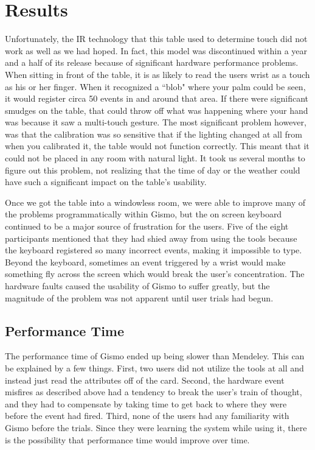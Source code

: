 \documentclass{article}
\begin{document}
\section{Results}

Unfortunately, the IR technology that this table used to determine touch did not work as well as we had hoped.  In fact, this model was discontinued within a year and a half of its release because of significant hardware performance problems.  When sitting in front of the table, it is as likely to read the users wrist as a touch as his or her finger.  When it recognized a ``blob" where your palm could be seen, it would register circa 50 events in and around that area.  If there were significant smudges on the table, that could throw off what was happening where your hand was because it saw a multi-touch gesture.  The most significant problem however, was that the calibration was so sensitive that if the lighting changed at all from when you calibrated it, the table would not function correctly.  This meant that it could not be placed in any room with natural light.  It took us several months to figure out this problem, not realizing that the time of day or the weather could have such a significant impact on the table's usability.  

Once we got the table into a windowless room, we were able to improve many of the problems programmatically within Gismo, but the on screen keyboard continued to be a major source of frustration for the users.  Five of the eight participants mentioned that they had shied away from using the tools because the keyboard registered so many incorrect events, making it impossible to type.  Beyond the keyboard, sometimes an event triggered by a wrist would make something fly across the screen which would break the user's concentration.  The hardware faults caused the usability of Gismo to suffer greatly, but the magnitude of the problem was not apparent until user trials had begun.  
      
\subsection*{Performance Time}


The performance time of Gismo ended up being slower than Mendeley.  This can be explained by a few things.  First, two users did not utilize the tools at all and instead just read the attributes off of the card.  Second, the hardware event misfires as described above had a tendency to break the user's train of thought, and they had to compensate by taking time to get back to where they were before the event had fired.  Third, none of the users had any familiarity with Gismo before the trials.  Since they were learning the system while using it, there is the possibility that performance time would improve over time. 
\end{document}
